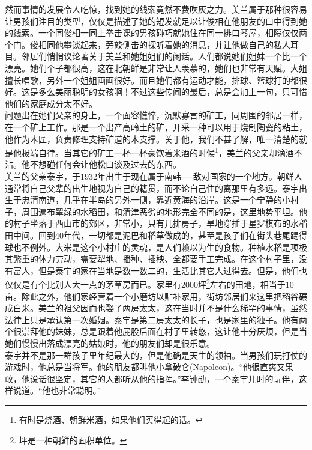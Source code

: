 然而事情的发展令人吃惊，找到她的线索竟然不费吹灰之力。美兰属于那种很容易让男孩们注目的类型，仅仅是描述了她的短发就足以让俊相在他朋友的口中得到她的线索。一个同俊相一同上拳击课的男孩碰巧就她住在同一排口琴屋，相隔仅仅两个门。俊相同他攀谈起来，旁敲侧击的探听着她的消息，并让他做自己的私人耳目。邻居们悄悄议论著关于美兰和她姐姐们的闲话。人们都说她们姐妹一个比一个漂亮。她们个子都很高，这在北朝鲜是非常让人羡慕的，她们也非常有天赋。大姐擅长唱歌，另外一个姐姐画画很好。而且她们都有运动才能，排球、篮球打的都很好。这是多么美丽聪明的女孩啊！不过这些传闻的最后，总是会加上一句，只可惜他们的家庭成分太不好。\\

问题出在她们父亲的身上，一个面容憔悴，沉默寡言的矿工，同周围的邻居一样，在一个矿上工作。那是一个出产高岭土的矿，开采一种可以用于烧制陶瓷的粘土，他作为木匠，负责修理支持矿道的木支撑。关于他，我们不甚了解，唯一清楚的就是他极端自律。当其它的矿工一杯一杯豪饮着米酒的时候\footnote{有时是烧酒、朝鲜米酒，如果他们买得起的话。}，美兰的父亲却滴酒不沾。他不想碰任何会让他松口谈及过去的东西。\\

美兰的父亲泰宇，于1932年出生于现在属于南韩──敌对国家的一个地方。朝鲜人通常将自己父辈的出生地视为自己的籍贯，而不论自己住的离那里有多远。泰宇出生于忠清南道，几乎在半岛的另外一侧，靠近黄海的沿岸。这是一个宁静的小村子，周围遍布翠绿的水稻田，和清津恶劣的地形完全不同的是，这里地势平坦。他的村子坐落于西山市的郊区，非常小，只有几排房子，旱地穿插于星罗棋布的水稻田中间。回到40年代，一切都是泥巴和稻草做成的，甚至是孩子们在街头巷尾踢得球也不例外。大米是这个小村庄的灵魂，是人们赖以为生的食物。种植水稻是项极其繁重的体力劳动，需要犁地、播种、插秧、全都要手工完成。在这个村子里，没有富人，但是泰宇的家在当地是数一数二的，生活比其它人过得去。但是，他们也仅仅是有个比别人大一点的茅草房而已。家里有2000坪\footnote{坪是一种朝鲜的面积单位。}左右的田地，相当于10亩。除此之外，他们家经营着一个小磨坊以贴补家用，街坊邻居们来这里把稻谷碾成白米。美兰的祖父因而也娶了两房太太，这在当时并不是什么稀罕的事情，虽然法律上只是承认第一次婚姻。泰宇是第二房太太的长子，也是家里的独子。他有两个很崇拜他的妹妹，总是跟着他屁股后面在村子里转悠，这让他十分厌烦，但是当她们慢慢出落成漂亮的姑娘时，他的朋友们却是很乐意。\\

泰宇并不是那一群孩子里年纪最大的，但是他确是天生的领袖。当男孩们玩打仗的游戏时，他总是当将军。他的朋友都叫他小拿破仑(Napoleon)。“他很直爽又果敢，他说话很坚定，其它的人都听从他的指挥。”李钟勋，一个泰宇儿时的玩伴，这样说道。“他也非常聪明。”\\

